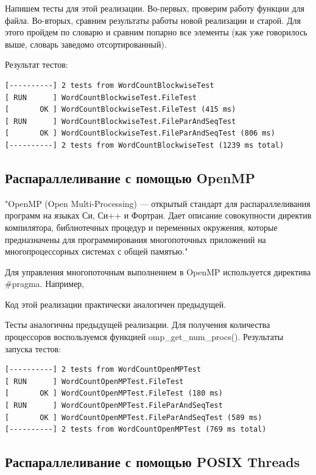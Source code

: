 Напишем тесты для этой реализации. Во-первых, проверим работу функции для файла. Во-вторых, сравним результаты работы новой реализации и старой. Для этого пройдем по словарю и сравним попарно все элементы (как уже говорилось выше, словарь заведомо отсортированный).



Результат тестов:
\begin{lstlisting}
[----------] 2 tests from WordCountBlockwiseTest
[ RUN      ] WordCountBlockwiseTest.FileTest
[       OK ] WordCountBlockwiseTest.FileTest (415 ms)
[ RUN      ] WordCountBlockwiseTest.FileParAndSeqTest
[       OK ] WordCountBlockwiseTest.FileParAndSeqTest (806 ms)
[----------] 2 tests from WordCountBlockwiseTest (1239 ms total)
\end{lstlisting}

\subsection{Распараллеливание с помощью OpenMP}

"OpenMP (Open Multi-Processing) — открытый стандарт для распараллеливания программ на языках Си, Си++ и Фортран. Дает описание совокупности директив компилятора, библиотечных процедур и переменных окружения, которые предназначены для программирования многопоточных приложений на многопроцессорных системах с общей памятью."

Для управления многопоточным выполнением в OpenMP используется директива \#pragma. Например, 

Код этой реализации практически аналогичен предыдущей.



Тесты аналогичны предыдущей реализации. Для получения количества процессоров воспользуемся функцией omp\_get\_num\_procs(). Результаты запуска тестов:
\begin{lstlisting}
[----------] 2 tests from WordCountOpenMPTest
[ RUN      ] WordCountOpenMPTest.FileTest
[       OK ] WordCountOpenMPTest.FileTest (180 ms)
[ RUN      ] WordCountOpenMPTest.FileParAndSeqTest
[       OK ] WordCountOpenMPTest.FileParAndSeqTest (589 ms)
[----------] 2 tests from WordCountOpenMPTest (769 ms total)
\end{lstlisting}

\subsection{Распараллеливание с помощью POSIX Threads}

